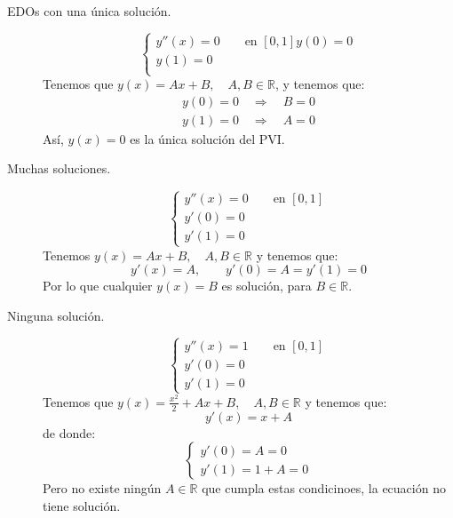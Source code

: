 \begin{description}
    \item [EDOs con una única solución.]
        \begin{equation*}
            \left\{\begin{array}{l}
                y''(x) = 0 \qquad \text{en\ } [0,1]
                y(0) = 0 \\
                y(1) = 0 \\
            \end{array}\right.
        \end{equation*}
        Tenemos que $y(x) = Ax + B, \quad A,B\in \mathbb{R}$, y tenemos que:
        \begin{gather*}
            y(0) = 0 \quad\Longrightarrow\quad B = 0 \\
            y(1) = 0 \quad\Longrightarrow\quad A = 0
        \end{gather*}
        Así, $y(x) = 0$ es la única solución del PVI.
    \item [Muchas soluciones.] 
        \begin{equation*}
            \left\{\begin{array}{l}
                y''(x) = 0 \qquad \text{en\ } [0,1] \\
                y'(0) = 0 \\
                y'(1) = 0
            \end{array}\right.
        \end{equation*}
        Tenemos $y(x) = Ax + B,\quad A,B\in \mathbb{R}$ y tenemos que:
        \begin{equation*}
            y'(x) = A, \qquad y'(0) = A = y'(1) = 0
        \end{equation*}
        Por lo que cualquier $y(x) = B$ es solución, para $B\in \mathbb{R}$.
    \item [Ninguna solución.]
        \begin{equation*}
            \left\{\begin{array}{l}
                y''(x) = 1 \qquad \text{en\ } [0,1] \\
                y'(0) = 0 \\
                y'(1) = 0
            \end{array}\right.
        \end{equation*}
        Tenemos que $y(x) = \frac{x^2}{2}+Ax+B,\quad A,B\in \mathbb{R}$ y tenemos que:
        \begin{equation*}
            y'(x) = x+A
        \end{equation*}
        de donde:
        \begin{equation*}
            \left\{\begin{array}{l}
                y'(0) = A = 0 \\
                y'(1) = 1+A = 0
            \end{array}\right.
        \end{equation*}
        Pero no existe ningún $A\in \mathbb{R}$ que cumpla estas condicinoes, la ecuación no tiene solución.
\end{description}

